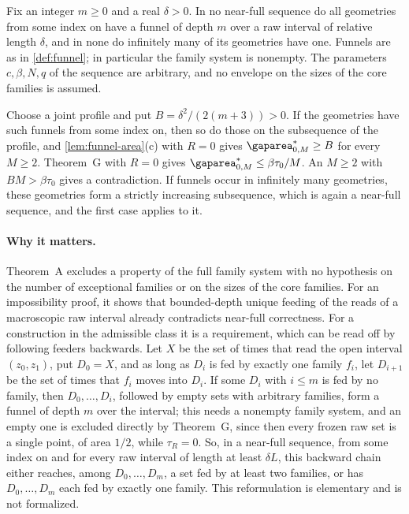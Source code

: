 \begin{theorem}\label{thm:funnels}
Fix an integer $m\ge0$ and a real $\delta>0$. In no near-full sequence do all
geometries from some index on have a funnel of depth $m$ over a raw interval of
relative length $\delta$, and in none do infinitely many of its geometries have one.
Funnels are as in \cref{def:funnel}; in particular the family system is nonempty.
The parameters $c,\beta,N,q$ of the sequence are arbitrary, and no envelope on the
sizes of the core families is assumed.
\end{theorem}

\begin{outline}
Choose a joint profile and put $B=\delta^2/(2(m+3))>0$. If the geometries have such
funnels from some index on, then so do those on the subsequence of the profile, and
\cref{lem:funnel-area}(c) with $R=0$ gives $\limarea_{0,M}\ge B$ for every $M\ge2$.
Theorem~G with $R=0$ gives $\limarea_{0,M}\le\beta\tau_0/M$. An $M\ge2$ with
$BM>\beta\tau_0$ gives a contradiction. If funnels occur in infinitely many geometries,
these geometries form a strictly increasing subsequence, which is again a near-full
sequence, and the first case applies to it.
\end{outline}

\paragraph{Why it matters.}
Theorem~A excludes a property of the full family system with no hypothesis on the
number of exceptional families or on the sizes of the core families. For an
impossibility proof, it shows that bounded-depth unique feeding of the reads of a
macroscopic raw interval already contradicts near-full correctness. For a construction
in the admissible class it is a requirement, which can be read off by following
feeders backwards. Let $X$ be the set of times that read the open interval
$(z_0,z_1)$, put $D_0=X$, and as long as $D_i$ is fed by exactly one family $f_i$, let
$D_{i+1}$ be the set of times that $f_i$ moves into $D_i$. If some $D_i$ with $i\le m$
is fed by no family, then $D_0,\dots,D_i$, followed by empty sets with arbitrary
families, form a funnel of depth $m$ over the interval; this needs a nonempty family
system, and an empty one is excluded directly by Theorem~G, since then every frozen raw
set is a single point, of area $1/2$, while $\tau_R=0$. So, in a near-full sequence,
from some index on and for every raw interval of length at least $\delta L$, this
backward chain either reaches, among $D_0,\dots,D_m$, a set fed by at least two
families, or has $D_0,\dots,D_m$ each fed by exactly one family. This reformulation is
elementary and is not formalized.
